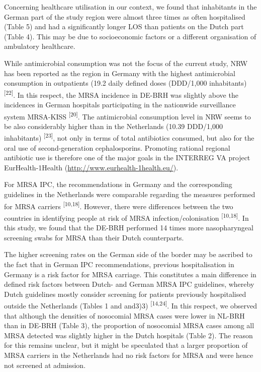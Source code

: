 \documentclass[
]{book}
\begin{document}
Concerning healthcare utilisation in our context, we found that inhabitants in the German part of the study region were almost three times as often hospitalised (Table 5) and had a significantly longer LOS than patients on the Dutch part (Table 4). This may be due to socioeconomic factors or a different organisation of ambulatory healthcare.

While antimicrobial consumption was not the focus of the current study, NRW has been reported as the region in Germany with the highest antimicrobial consumption in outpatients (19.2 daily defined doses (DDD/1,000 inhabitants) \textsuperscript{{[}22{]}}. In this respect, the MRSA incidence in DE-BRH was slightly above the incidences in German hospitals participating in the nationwide surveillance system MRSA-KISS \textsuperscript{{[}20{]}}. The antimicrobial consumption level in NRW seems to be also considerably higher than in the Netherlands (10.39 DDD/1,000 inhabitants) \textsuperscript{{[}23{]}}, not only in terms of total antibiotics consumed, but also for the oral use of second-generation cephalosporins. Promoting rational regional antibiotic use is therefore one of the major goals in the INTERREG VA project EurHealth-1Health (\url{http://www.eurhealth-1health.eu/}).

For MRSA IPC, the recommendations in Germany and the corresponding guidelines in the Netherlands were comparable regarding the measures performed for MRSA carriers \textsuperscript{{[}10,18{]}}. However, there were differences between the two countries in identifying people at risk of MRSA infection/colonisation \textsuperscript{{[}10,18{]}}. In this study, we found that the DE-BRH performed 14 times more nasopharyngeal screening swabs for MRSA than their Dutch counterparts.

The higher screening rates on the German side of the border may be ascribed to the fact that in German IPC recommendations, previous hospitalisation in Germany is a risk factor for MRSA carriage. This constitutes a main difference in defined risk factors between Dutch- and German MRSA IPC guidelines, whereby Dutch guidelines mostly consider screening for patients previously hospitalised outside the Netherlands (Tables 1 and and3)3) \textsuperscript{{[}14,24{]}}. In this respect, we observed that although the densities of nosocomial MRSA cases were lower in NL-BRH than in DE-BRH (Table 3), the proportion of nosocomial MRSA cases among all MRSA detected was slightly higher in the Dutch hospitals (Table 2). The reason for this remains unclear, but it might be speculated that a larger proportion of MRSA carriers in the Netherlands had no risk factors for MRSA and were hence not screened at admission.
\end{document}
